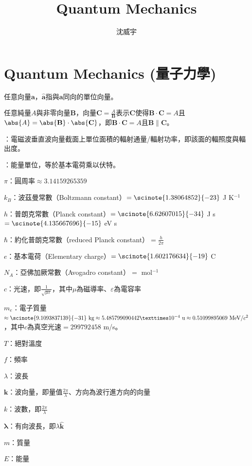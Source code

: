 \documentclass[a4paper,12pt]{article}
\begin{document}
\title{Quantum Mechanics}
\author{沈威宇}
\date{\temtoday}
\titletocdoc
\section{Quantum Mechanics (量子力學)}
\bit
\item 任意向量$\mathbf{a}$，$\hat{\mathbf{a}}$指與$\mathbf{a}$同向的單位向量。
\item 任意純量$A$與非零向量$\mathbf{B}$，向量$\mathbf{C}=\frac{A}{\mathbf{B}}$表示$\mathbf{C}$使得$\mathbf{B}\cdot \mathbf{C}=A$且$\abs{A}=\abs{\mathbf{B}}\cdot \abs{\mathbf{C}}$，即$\mathbf{B}\cdot \mathbf{C}=A$且$\mathbf{B}\parallel\mathbf{C}$。
\item {}：電磁波垂直波向量截面上單位面積的輻射通量/輻射功率，即該面的輻照度與輻出度。
\item {}：能量單位，等於基本電荷乘以伏特。
\item $\pi$：圓周率$\approx 3.14159265359$
\item $k_B$：波茲曼常數（Boltzmann constant）$=\scinote{1.38064852}{-23}$ J K$^{-1}$
\item $h$：普朗克常數（Planck constant）$=\scinote{6.62607015}{-34}$ J s $=\scinote{4.135667696}{-15}$ eV s
\item $\hbar$：約化普朗克常數（reduced Planck constant）$=\frac{h}{2\pi}$
\item $e$：基本電荷（Elementary charge）$=\scinote{1.602176634}{-19}$ C
\item $N_A$：亞佛加厥常數（Avogadro constant）$=$ mol$^{-1}$
\item $c$：光速，即$\frac{1}{\sqrt{\mu\varepsilon}}$，其中$\mu$為磁導率、$\varepsilon$為電容率
\item $m_e$：電子質量$\approx\scinote{9.1093837139}{-31}\text{\ kg}\approx5.485799090442×10^{-4}\text{\ u}\approx0.51099895069\text{\ MeV/}c^2$，其中$c$為真空光速$=299792458$ m/s。
\item $T$：絕對溫度
\item $f$：頻率
\item $\lambda$：波長
\item $\mathbf{k}$：波向量，即量值$\frac{2\pi}{\lambda}$、方向為波行進方向的向量
\item $k$：波數，即$\frac{2\pi}{\lambda}$
\item $\boldsymbol{\lambda}$：有向波長，即$\lambda\hat{\mathbf{k}}$
\item $m$：質量
\item $E$：能量
\end{document}
